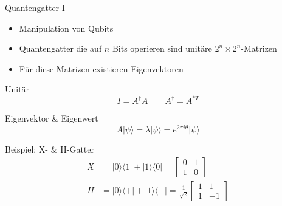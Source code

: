 \documentclass[compress,aspectratio=1610]{beamer}
\begin{document}
\begin{frame}{Quantengatter I}
    \begin{itemize}
    \item Manipulation von Qubits
    \item Quantengatter die auf $n$ Bits operieren sind unit\"are $2^n\times 2^n$-Matrizen
    \item Für diese Matrizen existieren Eigenvektoren 
    \end{itemize}
    \begin{minipage}{0.45\textwidth}
      \begin{block}{Unit\"ar}
        \begin{equation}\nonumber
          \boxed{I = A^{\dagger}A} \qquad A^{\dagger} = A^{\ast T}
        \end{equation}
      \end{block}
      \begin{block}{Eigenvektor \& Eigenwert}
        $$A|\psi\rangle = \lambda |\psi\rangle = e^{2\pi i \theta}|\psi\rangle$$
      \end{block}
    \end{minipage}
    \hfill
    \begin{minipage}{0.45\textwidth}
      \begin{block}{Beispiel: X- \& H-Gatter}
        \begin{equation}\nonumber
          \begin{aligned}
          X &= |0\rangle\langle1|+|1\rangle\langle0| =
          \begin{bmatrix}
            0 & 1 \\
            1 & 0
          \end{bmatrix}\\[1em]
          H &= |0\rangle\langle+|+|1\rangle\langle-| = \frac{1}{\sqrt{2}}
          \begin{bmatrix}
            1 & 1 \\
            1 & -1
          \end{bmatrix}
          \end{aligned}
        \end{equation}
      \end{block}
    \end{minipage}
\end{frame}
\end{document}
